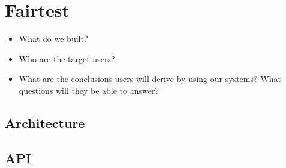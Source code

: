 \section{Fairtest}

\begin{itemize}
  \item What do we built?
  \item Who are the target users?
  \item What are the conclusions users will derive by using our systems?
    What questions will they be able to answer?
\end{itemize}

\subsection{Architecture}


\subsection{API}


